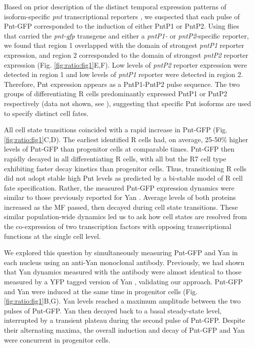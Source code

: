 Based on prior description of the distinct temporal expression patterns of isoform-specific \textit{pnt} transcriptional reporters \cite{Shwartz2013}, we suspected that each pulse of Pnt-GFP corresponded to the induction of either PntP1 or PntP2. Using flies that carried the \textit{pnt-gfp} transgene and either a \textit{pntP1-} or \textit{pntP2}-specific reporter, we found that region 1 overlapped with the domain of strongest \textit{pntP1} reporter expression, and region 2 corresponded to the domain of strongest \textit{pntP2} reporter expression (Fig. \ref{fig:ratio:fig1}E,F). Low levels of \textit{pntP2} reporter expression were detected in region 1 and low levels of \textit{pntP1} reporter were detected in region 2. Therefore, Pnt expression appears as a PntP1-PntP2 pulse sequence. The two groups of differentiating R cells predominantly expressed PntP1 or PntP2 respectively (data not shown, see \cite{Pelaez2016}), suggesting that specific Pnt isoforms are used to specify distinct cell fates.

All cell state transitions coincided with a rapid increase in Pnt-GFP (Fig. \ref{fig:ratio:fig1}C,D). The earliest identified R cells had, on average, 25-50\% higher levels of Pnt-GFP than progenitor cells at comparable times. Pnt-GFP then rapidly decayed in all differentiating R cells, with all but the R7 cell type exhibiting faster decay kinetics than progenitor cells. Thus, transitioning R cells did not adopt stable high Pnt levels as predicted by a bi-stable model of R cell fate specification. Rather, the measured Pnt-GFP expression dynamics were similar to those previously reported for Yan \cite{Pelaez2015a}. Average levels of both proteins increased as the MF passed, then decayed during cell state transitions. These similar population-wide dynamics led us to ask how cell states are resolved from the co-expression of two transcription factors with opposing transcriptional functions at the single cell level.

We explored this question by simultaneously measuring Pnt-GFP and Yan in each nucleus using an anti-Yan monoclonal antibody. Previously, we had shown that Yan dynamics measured with the antibody were almost identical to those measured by a YFP tagged version of Yan \cite{Pelaez2015a}, validating our approach. Pnt-GFP and Yan were induced at the same time in progenitor cells (Fig. \ref{fig:ratio:fig1}B,G). Yan levels reached a maximum amplitude between the two pulses of Pnt-GFP. Yan then decayed back to a basal steady-state level, interrupted by a transient plateau during the second pulse of Pnt-GFP. Despite their alternating maxima, the overall induction and decay of Pnt-GFP and Yan were concurrent in progenitor cells.

